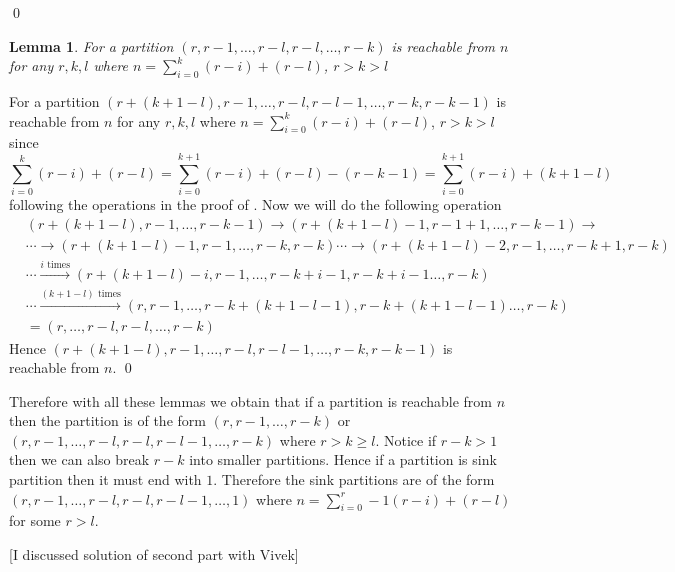 \documentclass[a4paper, 11pt]{article}
\newcounter{problem}
\newtheorem{lemma}{Lemma}
\renewenvironment{proof}{\noindent{\it \textbf{Proof:}}\hspace*{1em}}{\hfill\qed\bigskip\\}
\begin{document}
{\begin{proof}
\end{proof}
\begin{lemma}\label{lem16}
	For a partition $(r,r-1,\dots, r-l,r-l,\dots,r-k )$ is reachable from $n$ for any $r,k,l$  where $n=\sum\limits_{i=0}^k(r-i)+(r-l)$, $r>k> l$ 
\end{lemma}
\begin{proof}
	For a partition $(r+(k+1-l),r-1,\dots, r-l,r-l-1,\dots,r-k,r-k-1 )$ is reachable from $n$ for any $r,k,l$  where $n=\sum\limits_{i=0}^k(r-i)+(r-l)$, $r>k> l$ since $$\sum\limits_{i=0}^k(r-i)+(r-l)=\sum\limits_{i=0}^{k+1}(r-i)+(r-l)-(r-k-1)=\sum\limits_{i=0}^{k+1}(r-i)+(k+1-l)$$following the operations in the proof of . Now we will do the following operation \begin{align*}
		&	(r+(k+1-l),r-1,\dots,r-k-1 )\to (r+(k+1-l)-1,r-1+1,\dots,r-k-1 )\to\\
		&	\cdots\to (r+(k+1-l)-1,r-1,\dots,r-k,r-k )\cdots \to  (r+(k+1-l)-2,r-1,\dots,r-k+1,r-k )\\
		&	\cdots\xrightarrow{i\text{ times}}(r+(k+1-l)-i,r-1,\dots,r-k+i-1,r-k+i-1\dots,r-k )\\
		&	\cdots\xrightarrow{(k+1-l)\text{ times}}(r,r-1,\dots,r-k+(k+1-l-1),r-k+(k+1-l-1)\dots,r-k )\\
		& =(r,\dots, r-l,r-l,\dots, r-k)
	\end{align*}Hence $(r+(k+1-l),r-1,\dots, r-l,r-l-1,\dots,r-k,r-k-1 )$ is reachable from $n$.
\end{proof}

Therefore with all these lemmas we obtain that if a partition is reachable from $n$ then the partition is of the form $(r,r-1,\dots, r-k)$ or $(r,r-1,\dots, r-l,r-l,r-l-1,\dots, r-k)$ where $r>k\geq l$. Notice if $r-k>1$ then we can also break $r-k$ into smaller partitions. Hence if a partition is sink partition then it must end with $1$. Therefore the sink partitions are of the form $(r,r-1,\dots, r-l,r-l,r-l-1,\dots, 1)$ where $n=\sum\limits_{i=0}^r-1(r-i)+(r-l)$ for some $r>l$. 
}\parinf

[I discussed solution of second part with Vivek]\parinn
\addtocounter{problem}{1}

%
\end{document}
